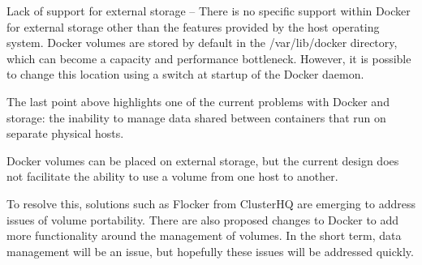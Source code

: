 Lack of support for external storage -- There is no specific support within Docker for external storage other than the features provided by the host operating system. Docker volumes are stored by default in the /var/lib/docker directory, which can become a capacity and performance bottleneck. However, it is possible to change this location using a switch at startup of the Docker daemon.

The last point above highlights one of the current problems with Docker and storage: the inability to manage data shared between containers that run on separate physical hosts.

Docker volumes can be placed on external storage, but the current design does not facilitate the ability to use a volume from one host to another.

To resolve this, solutions such as Flocker from ClusterHQ are emerging to address issues of volume portability. There are also proposed changes to Docker to add more functionality around the management of volumes. In the short term, data management will be an issue, but hopefully these issues will be addressed quickly.



